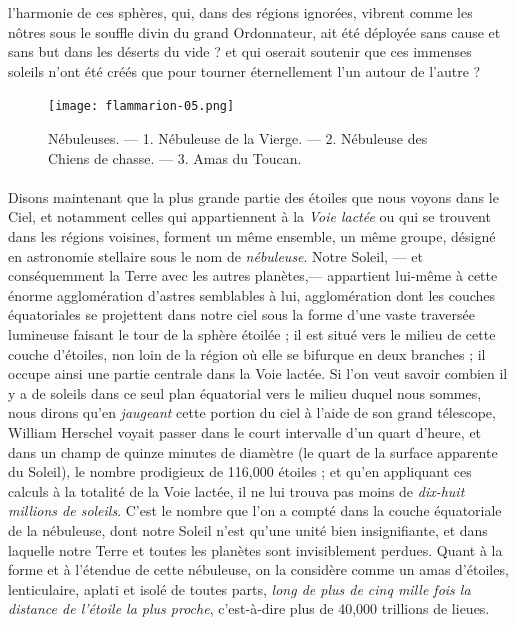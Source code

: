 \documentclass[a4paper, 11pt, oneside]{article}
\begin{document}
l'harmonie de ces sphères, qui, dans des régions ignorées, vibrent comme les nôtres sous le souffle divin du grand Ordonnateur, ait été déployée sans cause et sans but dans les déserts du vide ? et qui oserait soutenir que ces immenses soleils n'ont été créés que pour tourner éternellement l'un autour de l'autre ?
\clearpage
\vspace*{\fill}
\begin{figure}[H]
\centering
\texttt{[image: flammarion-05.png]}
\caption{\Fontauri Nébuleuses. --- 1. Nébuleuse de la Vierge. --- 2. Nébuleuse des Chiens de chasse. --- 3. Amas du Toucan.}
\end{figure}
\vspace*{\fill}
\clearpage
\paragraph{}
Disons maintenant que la plus grande partie des étoiles que nous voyons dans le Ciel, et notamment celles qui appartiennent à la \emph{Voie lactée} ou qui se trouvent dans les régions voisines, forment un même ensemble, un même groupe, désigné en astronomie stellaire sous le nom de \emph{nébuleuse}. Notre Soleil, --- et conséquemment la Terre avec les autres planètes,--- appartient lui-même à cette énorme agglomération d'astres semblables à lui, agglomération dont les couches équatoriales se projettent dans notre ciel sous la forme d'une vaste traversée lumineuse faisant le tour de la sphère étoilée ; il est situé vers le milieu de cette couche d'étoiles, non loin de la région où elle se bifurque en deux branches ; il occupe ainsi une partie centrale dans la Voie lactée. Si l'on veut savoir combien il y a de soleils dans ce seul plan équatorial vers le milieu duquel nous sommes, nous dirons qu'en \emph{jaugeant} cette portion du ciel à l'aide de son grand télescope, William Herschel voyait passer dans le court intervalle d'un quart d'heure, et dans un champ de quinze minutes de diamètre (le quart de la surface apparente du Soleil), le nombre prodigieux de 116,000 étoiles ; et qu'en appliquant ces calculs à la totalité de la Voie lactée, il ne lui trouva pas moins de \emph{dix-huit millions de soleils}. C'est le nombre que l'on a compté dans la couche équatoriale de la nébuleuse, dont notre Soleil n'est qu'une unité bien insignifiante, et dans laquelle notre Terre et toutes les planètes sont invisiblement perdues. Quant à la forme et à l'étendue de cette nébuleuse, on la considère comme un amas d'étoiles, lenticulaire, aplati et isolé de toutes parts, \emph{long de plus de cinq mille fois la distance de l'étoile la plus proche}, c'est-à-dire plus de 40,000 trillions de lieues.
\end{document}
